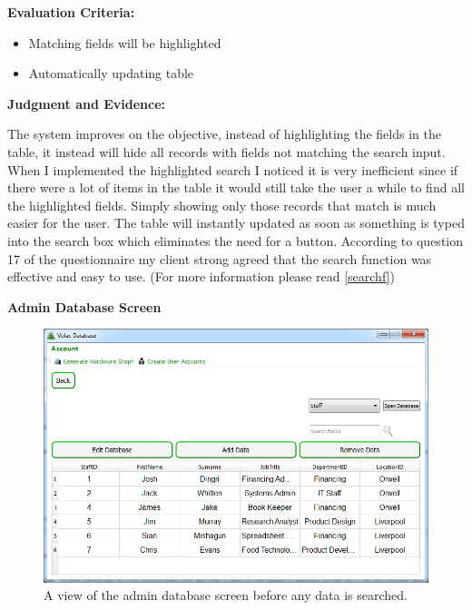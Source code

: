 \textbf{Evaluation Criteria:}
\begin{itemize}
\item{Matching fields will be highlighted}
\item{Automatically updating table}
\end{itemize}

\textbf{Judgment and Evidence:}

The system improves on the objective, instead of highlighting the fields in the table, it instead will hide all records with fields not matching the search input. When I implemented the highlighted search I noticed it is very inefficient since if there were a lot of items in the table it would still take the user a while to find all the highlighted fields. Simply showing only those records that match is much easier for the user. The table will instantly updated as soon as something is typed into the search box which eliminates the need for a button. According to question 17 of the questionnaire my client strong agreed that the search function was effective and easy to use. (For more information please read \ref{searchf})

\textbf{Admin Database Screen}

\begin{figure}[H]
    \includegraphics[width=\textwidth]{./Evaluation/Images/beforeadminsearch.png}
    \caption{A view of the admin database screen before any data is searched.} 
\end{figure}



